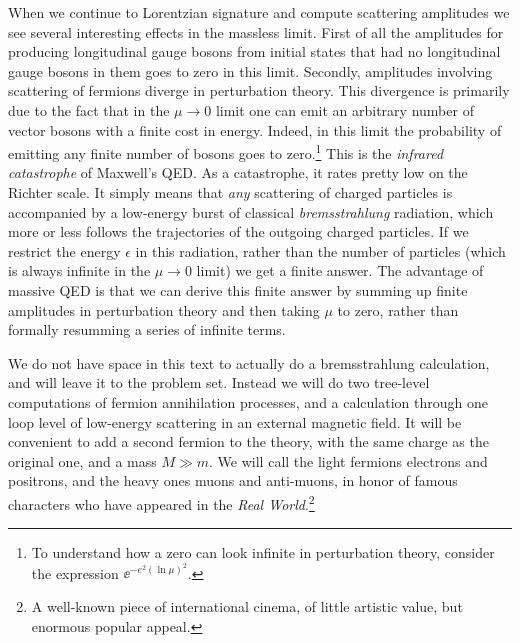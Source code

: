 When we continue to Lorentzian signature and compute scattering amplitudes we see
several interesting effects in the massless limit. First of all the amplitudes for producing
longitudinal gauge bosons from initial states that had no longitudinal gauge bosons in
them goes to zero in this limit. Secondly, amplitudes involving scattering of fermions
diverge in perturbation theory. This divergence is primarily due to the fact that in the
$\mu\to0$ limit one can emit an arbitrary number of vector bosons with a finite cost in
energy. Indeed, in this limit the probability of emitting any finite number of bosons goes
to zero.\footnote[2]{To understand how a zero can look infinite in perturbation theory, consider the expression $\ee^{-e^2(\ln\mu)^2}$.} This is the \emph{infrared catastrophe} of Maxwell’s QED. As a catastrophe, it rates
pretty low on the Richter scale. It simply means that \emph{any} scattering of charged particles
is accompanied by a low-energy burst of classical \emph{bremsstrahlung} radiation, which more
or less follows the trajectories of the outgoing charged particles. If we restrict the energy
$\epsilon$ in this radiation, rather than the number of particles (which is always infinite in the
$\mu\to0$ limit) we get a finite answer. The advantage of massive QED is that we can
derive this finite answer by summing up finite amplitudes in perturbation theory and
then taking $\mu$ to zero, rather than formally resumming a series of infinite terms.

We do not have space in this text to actually do a bremsstrahlung calculation, and
will leave it to the problem set. Instead we will do two tree-level computations of
fermion annihilation processes, and a calculation through one loop level of low-energy
scattering in an external magnetic field. It will be convenient to add a second fermion
to the theory, with the same charge as the original one, and a mass $M\gg m$. We will call
the light fermions electrons and positrons, and the heavy ones muons and anti-muons,
in honor of famous characters who have appeared in the \emph{Real World}.\footnote[3]{A well-known piece of international cinema, of little artistic value, but enormous popular appeal.}
